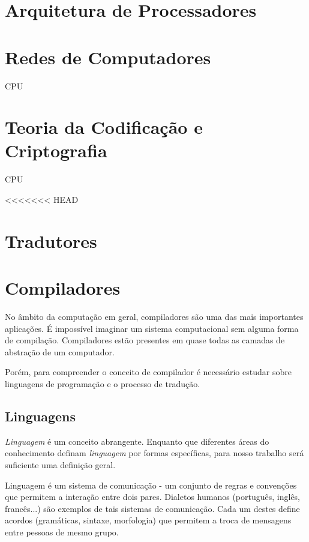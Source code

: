 \section{Arquitetura de Processadores}

\section{Redes de Computadores}

CPU

\section{Teoria da Codificação e Criptografia}

CPU

<<<<<<< HEAD
\section{Tradutores}

\section{Compiladores}

No âmbito da computação em geral, compiladores são uma das mais importantes
aplicações.  É impossível imaginar um sistema computacional sem alguma forma de
compilação. Compiladores estão presentes em quase todas as camadas de abstração
de um computador.

Porém, para compreender o conceito de compilador é necessário estudar sobre
linguagens de programação e o processo de tradução.

\subsection{Linguagens}

\textit{Linguagem} é um conceito abrangente. Enquanto que diferentes áreas do
conhecimento definam \textit{linguagem} por formas específicas, para nosso
trabalho será suficiente uma definição geral.

Linguagem é um sistema de comunicação - um conjunto de regras e convenções que
permitem a interação entre dois pares. Dialetos humanos (português, inglês,
francês...) são exemplos de tais sistemas de comunicação. Cada um destes define
acordos (gramáticas, sintaxe, morfologia) que permitem a troca de mensagens
entre pessoas de mesmo grupo.

